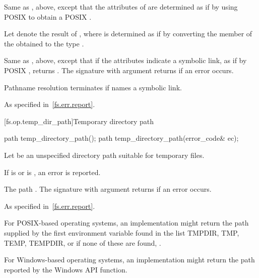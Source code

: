 \begin{itemdescr}
\pnum
\effects Same as , above,
  except that the attributes
    of  are determined as if by using POSIX 
    to obtain a POSIX .

\pnum
Let  denote the result of ,
where  is determined as if by converting the  member
of the obtained  to the type .

\pnum
\returns Same as , above, except
      that if the attributes indicate a symbolic link, as if by POSIX ,
      returns .
      The signature with argument  returns
       if an error occurs.

\pnum
\remarks Pathname resolution terminates if  names a symbolic link.

\pnum
\throws As specified in~\ref{fs.err.report}.
\end{itemdescr}


[fs.op.temp_dir_path]{Temporary directory path}

%
\begin{itemdecl}
path temp_directory_path();
path temp_directory_path(error_code& ec);
\end{itemdecl}

\begin{itemdescr}
\pnum
Let  be an unspecified directory path suitable for temporary files.

\pnum
\effects If  is  or  is
  , an error is reported.

\pnum
\returns The path .
  The signature with argument  returns  if an
  error occurs.

\pnum
\throws As specified in~\ref{fs.err.report}.

\pnum
\begin{example} For POSIX-based operating systems, an implementation might
  return the path
  supplied by the first environment variable found in the list TMPDIR, TMP, TEMP, TEMPDIR,
  or if none of these are found, .

For Windows-based operating systems, an implementation might return the path
  reported by the Windows  API function.
\end{example}
\end{itemdescr}

